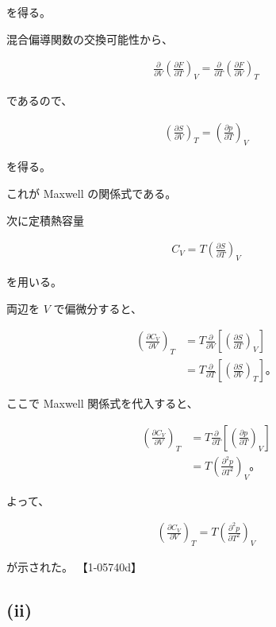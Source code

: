 \documentclass[platex,dvipdfmx,a4paper]{jsarticle}
\begin{document}
を得る。

混合偏導関数の交換可能性から、

\begin{align*}
\frac{\partial}{\partial V}
\left(
\frac{\partial F}{\partial T}
\right)_V
=
\frac{\partial}{\partial T}
\left(
\frac{\partial F}{\partial V}
\right)_T
\end{align*}

であるので、

\begin{align*}
\left(
\frac{\partial S}{\partial V}
\right)_T
=
\left(
\frac{\partial p}{\partial T}
\right)_V
\end{align*}

を得る。

これが Maxwell の関係式である。

次に定積熱容量

\begin{align*}
C_V
=
T
\left(
\frac{\partial S}{\partial T}
\right)_V
\end{align*}

を用いる。

両辺を $V$ で偏微分すると、

\begin{align*}
\left(
\frac{\partial C_V}{\partial V}
\right)_T
&=
T
\frac{\partial}{\partial V}
\left[
\left(
\frac{\partial S}{\partial T}
\right)_V
\right] \\
&=
T
\frac{\partial}{\partial T}
\left[
\left(
\frac{\partial S}{\partial V}
\right)_T
\right]。
\end{align*}

ここで Maxwell 関係式を代入すると、

\begin{align*}
\left(
\frac{\partial C_V}{\partial V}
\right)_T
&=
T
\frac{\partial}{\partial T}
\left[
\left(
\frac{\partial p}{\partial T}
\right)_V
\right] \\
&=
T
\left(
\frac{\partial^2p}{\partial T^2}
\right)_V。
\end{align*}

よって、

\begin{align*}
\left(
\frac{\partial C_V}{\partial V}
\right)_T
=
T
\left(
\frac{\partial^2p}{\partial T^2}
\right)_V
\end{align*}

が示された。 【1-05740d】

\subsection{(ii)}
\end{document}

